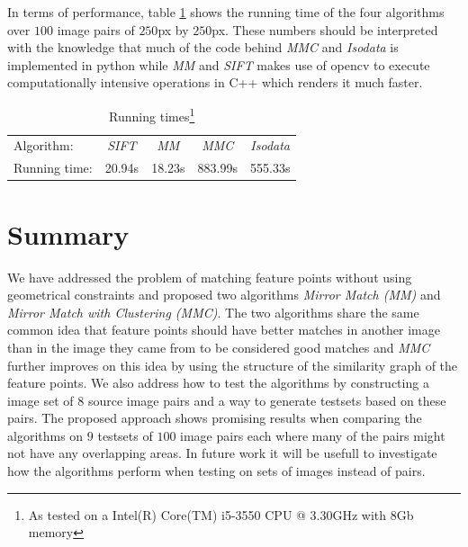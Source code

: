 \documentclass[12pt,journal,compsoc]{IEEEtran}
\begin{document}
In terms of performance, table \ref{table:running_times} shows the 
running time of the four algorithms over $100$ image pairs of $250$px by 
$250$px. These numbers should be interpreted with the knowledge that 
much of the code behind \emph{MMC} and \emph{Isodata} is implemented in 
python while \emph{MM} and \emph{SIFT} makes use of opencv to execute 
computationally intensive operations in C++ which renders it much 
faster.
%
\begin{savenotes}
\begin{table}
	\centering
	\small
\begin{tabular}{l*{4}{c}}
	Algorithm: & \emph{SIFT} & \emph{MM} & \emph{MMC} & \emph{Isodata} 
	\\
	\noalign{\smallskip} 
	Running time: & 20.94s & 18.23s & 883.99s & 555.33s \\
\end{tabular}
\caption{Running times\footnote{As tested on a Intel(R) Core(TM) i5-3550 
CPU @ 3.30GHz with 8Gb memory}}
\label{table:running_times}
\end{table}
\end{savenotes}
%
\section{Summary}
We have addressed the problem of matching feature points without using 
geometrical constraints and proposed two algorithms \emph{Mirror Match 
(MM)} and \emph{Mirror Match with Clustering (MMC)}. The two algorithms 
share the same common idea that feature points should have better 
matches in another image than in the image they came from to be 
considered good matches and \emph{MMC} further improves on this idea by 
using the structure of the similarity graph of the feature points. We 
also address how to test the algorithms by constructing a image set of 
$8$ source image pairs and a way to generate testsets based on these 
pairs. The proposed approach shows promising results when comparing the 
algorithms on $9$ testsets of $100$ image pairs each where many of the 
pairs might not have any overlapping areas. In future work it will be 
usefull to investigate how the algorithms perform when testing on sets 
of images instead of pairs.
%


\end{document}
